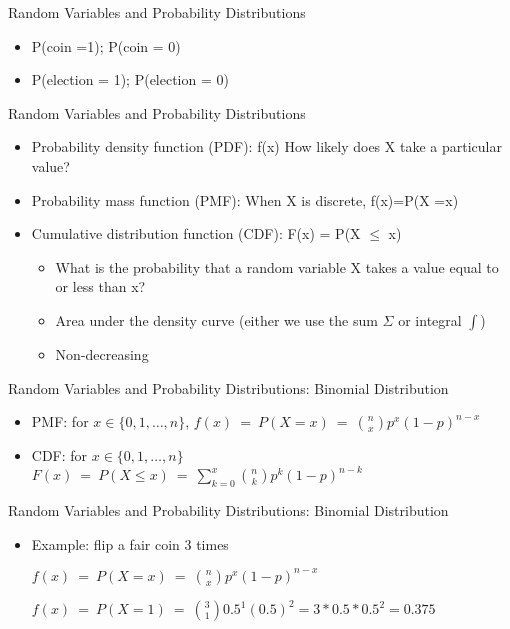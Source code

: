\documentclass[presentation]{beamer}
\begin{document}
\begin{frame}[label={sec:org9636d17}]{Random Variables and Probability Distributions}
\begin{itemize}
\item P(coin =1); P(coin = 0)
\item P(election = 1); P(election = 0)
\end{itemize}
\end{frame}


\begin{frame}[label={sec:org5394eb1}]{Random Variables and Probability Distributions}
\begin{itemize}
\item \alert{Probability density function (PDF)}: f(x) How likely does X take a particular value?
\item \alert{Probability mass function (PMF)}: When X is discrete, f(x)=P(X =x)
\end{itemize}

\pause

\begin{itemize}
\item \alert{Cumulative distribution function (CDF)}: F(x) = P(X \(\leq\) x)
\begin{itemize}
\item What is the probability that a random variable X takes a value equal to or less than x?
\item Area under the density curve (either we use the sum \(\Sigma\) or integral \(\int\))
\item Non-decreasing
\end{itemize}
\end{itemize}
\end{frame}


\begin{frame}[label={sec:org154af3c}]{Random Variables and Probability Distributions: Binomial Distribution}
\begin{itemize}
\item \alert{PMF}: for \(x \in \{0, 1, \dots, n\}\),
\(f(x) \ = \ P(X = x) \ = \ {n \choose x} p^x (1-p)^{n-x}\)

\item \alert{CDF}: for \(x \in \{0, 1, \dots, n\}\)
\(F(x) \ = \ P(X \le x) \ = \ \sum_{k = 0}^x {n\choose k} p^k (1-p)^{n-k}\)
\end{itemize}
\end{frame}



\begin{frame}[label={sec:org82acbc0}]{Random Variables and Probability Distributions: Binomial Distribution}
\begin{itemize}
\item Example: flip a fair coin 3 times

\(f(x) \ = \ P(X = x) \ = \ {n \choose x} p^x (1-p)^{n-x}\)

\(f(x) \ = \ P(X = 1) \ = \ {3 \choose 1} 0.5^1 (0.5)^{2} = 3*0.5*0.5^2 = 0.375\)
\end{itemize}
\end{frame}
\end{document}

